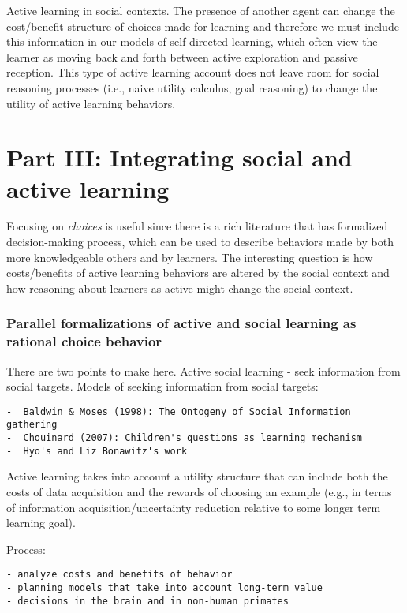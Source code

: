 \documentclass[a4paper,man,apacite,floatsintext]{apa6}
\begin{document}
Active learning in social contexts. The presence of another agent can
change the cost/benefit structure of choices made for learning and
therefore we must include this information in our models of
self-directed learning, which often view the learner as moving back and
forth between active exploration and passive reception. This type of
active learning account does not leave room for social reasoning
processes (i.e., naive utility calculus, goal reasoning) to change the
utility of active learning behaviors.

\section{Part III: Integrating social and active
learning}\label{part-iii-integrating-social-and-active-learning}

Focusing on \emph{choices} is useful since there is a rich literature
that has formalized decision-making process, which can be used to
describe behaviors made by both more knowledgeable others and by
learners. The interesting question is how costs/benefits of active
learning behaviors are altered by the social context and how reasoning
about learners as active might change the social context.

\subsubsection{Parallel formalizations of active and social learning as
rational choice
behavior}\label{parallel-formalizations-of-active-and-social-learning-as-rational-choice-behavior}

There are two points to make here. Active social learning - seek
information from social targets. Models of seeking information from
social targets:

\begin{verbatim}
-  Baldwin & Moses (1998): The Ontogeny of Social Information gathering
-  Chouinard (2007): Children's questions as learning mechanism
-  Hyo's and Liz Bonawitz's work
\end{verbatim}

Active learning takes into account a utility structure that can include
both the costs of data acquisition and the rewards of choosing an
example (e.g., in terms of information acquisition/uncertainty reduction
relative to some longer term learning goal).

Process:

\begin{verbatim}
- analyze costs and benefits of behavior
- planning models that take into account long-term value
- decisions in the brain and in non-human primates 
\end{verbatim}
\end{document}
